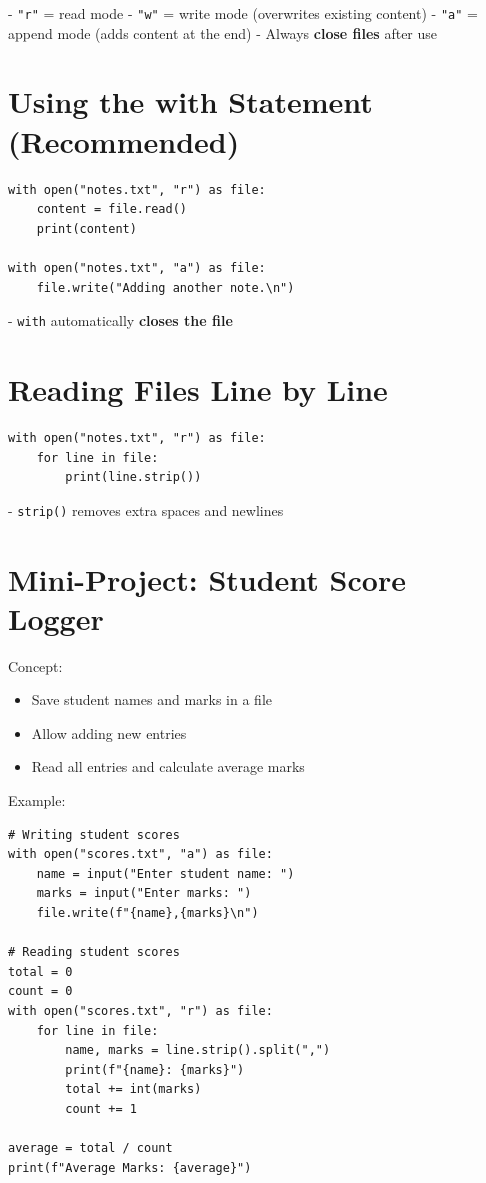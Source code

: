 - \texttt{"r"} = read mode  
- \texttt{"w"} = write mode (overwrites existing content)  
- \texttt{"a"} = append mode (adds content at the end)  
- Always \textbf{close files} after use  

\section{Using the with Statement (Recommended)}

\begin{verbatim}
with open("notes.txt", "r") as file:
    content = file.read()
    print(content)

with open("notes.txt", "a") as file:
    file.write("Adding another note.\n")
\end{verbatim}

- \texttt{with} automatically \textbf{closes the file}  

\section{Reading Files Line by Line}

\begin{verbatim}
with open("notes.txt", "r") as file:
    for line in file:
        print(line.strip())
\end{verbatim}

- \texttt{strip()} removes extra spaces and newlines  

\section{Mini-Project: Student Score Logger}

Concept:

\begin{itemize}
    \item Save student names and marks in a file  
    \item Allow adding new entries  
    \item Read all entries and calculate average marks  
\end{itemize}

Example:

\begin{verbatim}
# Writing student scores
with open("scores.txt", "a") as file:
    name = input("Enter student name: ")
    marks = input("Enter marks: ")
    file.write(f"{name},{marks}\n")

# Reading student scores
total = 0
count = 0
with open("scores.txt", "r") as file:
    for line in file:
        name, marks = line.strip().split(",")
        print(f"{name}: {marks}")
        total += int(marks)
        count += 1

average = total / count
print(f"Average Marks: {average}")
\end{verbatim}

